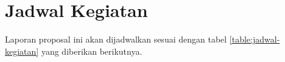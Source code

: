\section{Jadwal Kegiatan}
Laporan proposal ini akan dijadwalkan sesuai dengan tabel \ref{table:jadwal-kegiatan} yang diberikan berikutnya. 
